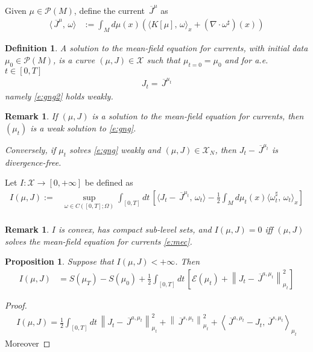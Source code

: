 \documentclass[reqno]{amsart}
\newtheorem{proposition}[theorem]{Proposition}
\newtheorem{definition}[theorem]{Definition}
\newtheorem{remark}[theorem]{Remark}
\numberwithin{equation}{section}
\numberwithin{theorem}{section}
\newcommand{\mc}[1]{{\mathcal #1}}
\newcommand{\upbar}[1]{\,\overline{\! #1}}
\newcommand{\bel}[2]{\begin{equation} \label{#1} \begin{split} #2
 \end{split} \end{equation}}
\newcommand{\dangle}[2]{\langle #1,\,#2 \rangle}
\begin{document}
Given $\mu \in \mc P(M)$, define the current $\upbar J^\mu$ as
\bel{e:jmu1}{
\dangle{\upbar J^\mu}{\omega}&:=\int_M d\mu(x) \left(\dangle{K[\mu]}{\omega}_x + (\nabla \cdot\omega^\sharp)(x)\right)
}

\begin{definition}
\label{d:mec}
A solution to the \emph{mean-field equation for currents}, with initial data $\mu_0\in \mc P(M)$, is a curve $(\mu,J)\in \mc X$ such that $\mu_{t=0}=\mu_0$ and for a.e.\ $t\in [0,T]$
\bel{e:mec}{
J_t=\upbar J^{\mu_t}
}
namely \eqref{e:gng2} holds weakly.
\end{definition}

\begin{remark}
\label{r:mec1}
If $(\mu,J)$ is a solution to the mean-field equation for currents, then $(\mu_t)$ is a weak solution to \eqref{e:gng}.

Conversely, if $\mu_t$ solves \eqref{e:gng} weakly and $(\mu,J)\in \mc X_N$, then $J_t-\upbar J^{\mu_t}$ is divergence-free.
\end{remark}
Let $I \colon \mc X \to [0,+\infty]$ be defined as
\bel{e:ldfunc1}{
I(\mu,J):= &
\sup_{\omega \in C([0,T];\Omega)}
 \int_{[0,T]} dt\, \left[ \dangle{J_t-\upbar J^{\mu_t}}{\omega_t} -\tfrac 12\int_M d\mu_t(x) \dangle{ \omega_t^\sharp}{\omega_t}_x\right]
 \\
}
\begin{remark}
\label{r:ldfunc1}
$I$ is convex, has compact sub-level sets, and $I(\mu,J)=0$ iff $(\mu,J)$ solves the mean-field equation for currents \eqref{e:mec}.
\end{remark}


\begin{proposition}
Suppose that $I(\mu,J)<+\infty$. Then
\label{r:ldfunc2}
\bel{e:ldfunc2}{
I(\mu,J)& =S(\mu_T)-S(\mu_0)+\tfrac 12 \int_{[0,T]}dt\,\left[\mc E(\mu_t)+\left\|J_t-\upbar J^{a,\mu_t}\right\|_{\mu_t}^2
\right]
}
\end{proposition}
\begin{proof}
\bel{e:decmec4}{
I(\mu,J)=\tfrac 12 \int_{[0,T]}dt\,\left\|J_t-\upbar J^{a,\mu_t}\right\|_{\mu_t}^2+\left\|\upbar J^{s,\mu_t}\right\|_{\mu_t}^2+\left\langle \upbar J^{a,\mu_t}-J_t,\upbar J^{s,\mu_t} \right\rangle_{\mu_t}
}
 Moreover
\end{proof}
\end{document}
